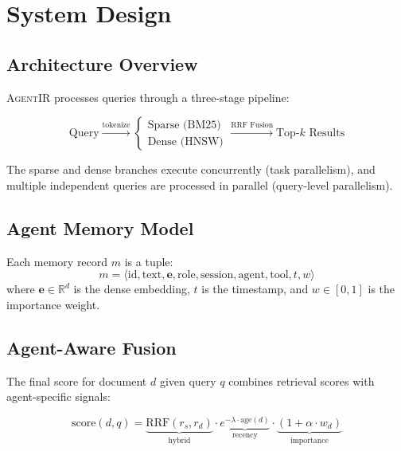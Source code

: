 \documentclass[sigconf,nonacm,anonymous]{acmart}
\newcommand{\sysname}{\textsc{AgentIR}}
\begin{document}
\section{System Design}
\label{sec:design}

\subsection{Architecture Overview}

\sysname{} processes queries through a three-stage pipeline:

\begin{equation}
\text{Query} \xrightarrow{\text{tokenize}}
\begin{cases}
  \text{Sparse (BM25)} \\
  \text{Dense (HNSW)}
\end{cases}
\xrightarrow{\text{RRF Fusion}} \text{Top-}k \text{ Results}
\label{eq:pipeline}
\end{equation}

The sparse and dense branches execute concurrently (task parallelism),
and multiple independent queries are processed in parallel (query-level
parallelism).

\subsection{Agent Memory Model}

Each memory record $m$ is a tuple:
\begin{equation}
m = \langle \text{id}, \text{text}, \mathbf{e}, \text{role}, \text{session},
\text{agent}, \text{tool}, t, w \rangle
\end{equation}
where $\mathbf{e} \in \mathbb{R}^d$ is the dense embedding, $t$ is the
timestamp, and $w \in [0, 1]$ is the importance weight.

\subsection{Agent-Aware Fusion}

The final score for document $d$ given query $q$ combines retrieval
scores with agent-specific signals:

\begin{equation}
\text{score}(d, q) = \underbrace{\text{RRF}(r_s, r_d)}_{\text{hybrid}}
\cdot \underbrace{e^{-\lambda \cdot \text{age}(d)}}_{\text{recency}}
\cdot \underbrace{(1 + \alpha \cdot w_d)}_{\text{importance}}
\label{eq:fusion}
\end{equation}
\end{document}
